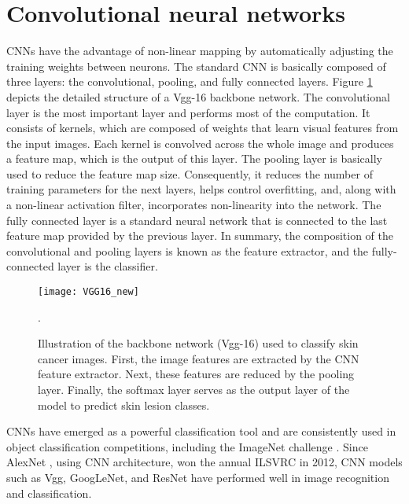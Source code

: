 \section{Convolutional neural networks}  \label{sec:volumetric}
CNNs have the advantage of non-linear mapping by automatically adjusting the training weights between neurons. The standard CNN is basically composed of three layers: the convolutional, pooling, and fully connected layers. Figure \ref{Fig:vgg16} depicts the detailed structure of a Vgg-16 backbone network. The convolutional layer is the most important layer and performs most of the computation. It consists of kernels, which are composed of weights that learn visual features from the input images. Each kernel is convolved across the whole image and produces a feature map, which is the output of this layer. The pooling layer is basically used to reduce the feature map size. Consequently, it reduces the number of training parameters for the next layers, helps control overfitting, and, along with a non-linear activation filter, incorporates non-linearity into the network. The fully connected layer is a standard neural network that is connected to the last feature map provided by the previous layer. In summary, the composition of the convolutional and pooling layers is known as the feature extractor, and the fully-connected layer is the classifier.

\begin{figure}[!h]
\centering
	\texttt{[image: VGG16\_new]}
		\caption{Illustration of the backbone network (Vgg-16) used to classify skin cancer images. First, the image features are extracted by the CNN feature extractor. Next, these features are reduced by the pooling layer. Finally, the softmax layer serves as the output layer of the model to predict skin lesion classes. \cite{haris_iqbal_2018_2526396,simonyan2014very}}.
		\label{Fig:vgg16} 
\end{figure}

CNNs have emerged as a powerful classification tool and are consistently used in object classification competitions, including the ImageNet challenge \cite{russakovsky2015imagenet}. Since AlexNet \cite{krizhevsky2017imagenet}, using CNN architecture, won the annual ILSVRC in 2012, CNN models such as Vgg\cite{simonyan2014very}, GoogLeNet\cite{szegedy2015going}, and ResNet\cite{he2016deep} have performed well in image recognition and classification. 

